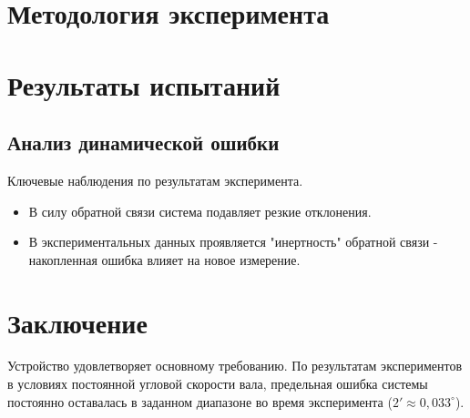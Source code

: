 \section{Методология эксперимента}

\section{Результаты испытаний}

\subsection{Анализ динамической ошибки}

Ключевые наблюдения по результатам эксперимента.
\begin{itemize}
\item В силу обратной связи система подавляет резкие отклонения.
\item В экспериментальных данных проявляется "инертность" обратной связи - накопленная ошибка влияет на новое измерение.

\end{itemize}

\section{Заключение}
Устройство удовлетворяет основному требованию. По результатам экспериментов в условиях постоянной угловой скорости вала, предельная ошибка 
системы постоянно оставалась в заданном диапазоне во время эксперимента ($2' \approx 0,033^\circ$). 




